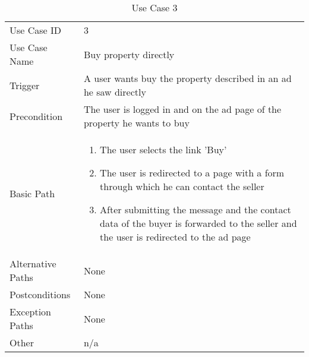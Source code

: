 \begin{table}[H]
\centering
\label{table-use-case-3}
\begin{tabular}{|p{3cm}|p{10cm}}
Use Case ID       & 3                                                           \\
Use Case Name     & Buy property directly                                                         \\
Trigger           & A user wants buy the property described in an ad he saw directly \\
Precondition      & The user is logged in and on the ad page of the property he wants to buy\\
Basic Path        & \begin{enumerate}
\item The user selects the link 'Buy'
\item The user is redirected to a page with a form through which he can contact the seller
\item After submitting the message and the contact data of the buyer is forwarded to the seller and the user is redirected to the ad page
\end{enumerate} 
     \\
Alternative Paths & None                          \\
Postconditions    & None				\\
Exception Paths   & None            \\
Other             & n/a                                                                                                                                                                                                        
\end{tabular}
\caption{Use Case 3}
\end{table}

